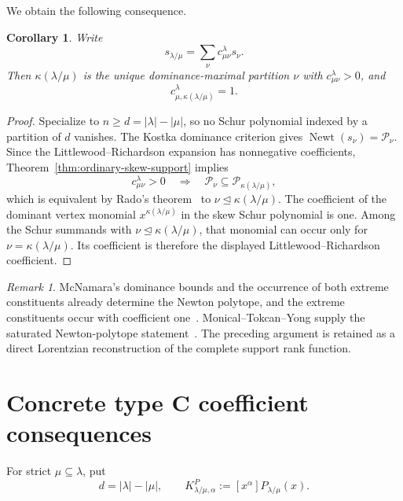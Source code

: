 \documentclass[11pt,a4paper,oneside]{amsart}
\numberwithin{equation}{section}
\newtheorem{corollary}[theorem]{Corollary}
\theoremstyle{definition}
\theoremstyle{remark}
\newtheorem{remark}[theorem]{Remark}
\DeclareMathOperator{\Newt}{Newt}
\newcommand{\abs}[1]{\lvert#1\rvert}
\begin{document}
We obtain the following consequence.

\begin{corollary}\label{cor:ordinary-maximal-constituent}
Write
\[
 s_{\lambda/\mu}=\sum_{\nu}c_{\mu\nu}^{\lambda}s_\nu.
\]
Then $\kappa(\lambda/\mu)$ is the unique dominance-maximal partition $\nu$ with $c_{\mu\nu}^{\lambda}>0$, and
\[
 c_{\mu,\kappa(\lambda/\mu)}^{\lambda}=1.
\]
\end{corollary}

\begin{proof}
Specialize to $n\geq d=|\lambda|-|\mu|$, so no Schur polynomial indexed by a partition of $d$ vanishes.  The Kostka dominance criterion gives $\Newt(s_\nu)=\mathcal P_\nu$.  Since the Littlewood--Richardson expansion has nonnegative coefficients, Theorem~\ref{thm:ordinary-skew-support} implies
\[
 c_{\mu\nu}^{\lambda}>0\quad\Longrightarrow\quad
 \mathcal P_\nu\subseteq\mathcal P_{\kappa(\lambda/\mu)},
\]
which is equivalent by Rado's theorem~\cite{Rado52} to $\nu\unlhd\kappa(\lambda/\mu)$.  The coefficient of the dominant vertex monomial $x^{\kappa(\lambda/\mu)}$ in the skew Schur polynomial is one.  Among the Schur summands with $\nu\unlhd\kappa(\lambda/\mu)$, that monomial can occur only for $\nu=\kappa(\lambda/\mu)$.  Its coefficient is therefore the displayed Littlewood--Richardson coefficient.
\end{proof}

\begin{remark}
McNamara's dominance bounds and the occurrence of both extreme constituents already determine the Newton polytope, and the extreme constituents occur with coefficient one~\cite[Proposition~3.1 and its proof]{McNamara08}.  Monical--Tokcan--Yong supply the saturated Newton-polytope statement~\cite[Corollary~5.10]{MTY19}.  The preceding argument is retained as a direct Lorentzian reconstruction of the complete support rank function.
\end{remark}

\section{Concrete type C coefficient consequences}\label{sec:concrete-C}

For strict $\mu\subseteq\lambda$, put
\[
 d=\abs\lambda-\abs\mu,
 \qquad
 K^P_{\lambda/\mu,\alpha}:=[x^\alpha]P_{\lambda/\mu}(x).
\]
\end{document}
